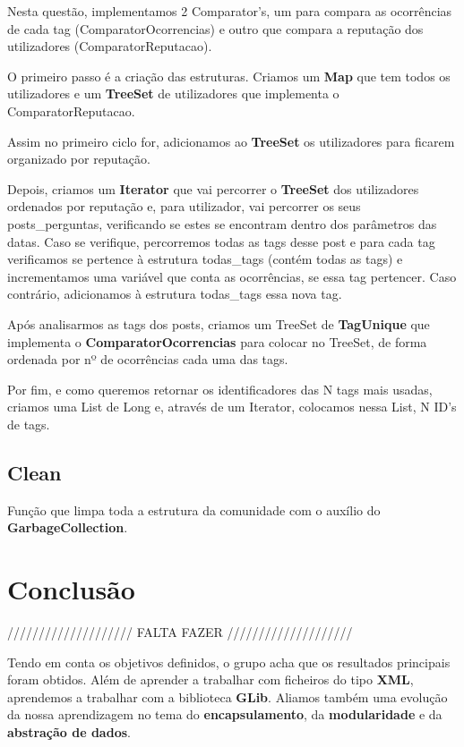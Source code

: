 \documentclass[a4paper]{article}
\begin{document}
Nesta questão, implementamos 2 Comparator's, um para compara as ocorrências de cada tag (ComparatorOcorrencias) e outro que compara a reputação dos utilizadores (ComparatorReputacao).

O primeiro passo é a criação das estruturas. Criamos um \textbf{Map} que tem todos os utilizadores e um \textbf{TreeSet} de utilizadores que implementa o ComparatorReputacao.

Assim no primeiro ciclo for, adicionamos ao \textbf{TreeSet} os utilizadores para ficarem organizado por reputação.

Depois, criamos um \textbf{Iterator} que vai percorrer o \textbf{TreeSet} dos utilizadores ordenados por reputação e, para utilizador, vai percorrer os seus posts_perguntas, verificando se estes se encontram dentro dos parâmetros das datas. Caso se verifique, percorremos todas as tags desse post e para cada tag verificamos se pertence à estrutura todas_tags (contém todas as tags) e incrementamos uma variável que conta as ocorrências, se essa tag pertencer. Caso contrário, adicionamos à estrutura todas_tags essa nova tag.

Após analisarmos as tags dos posts, criamos um TreeSet de \textbf{TagUnique} que implementa o \textbf{ComparatorOcorrencias} para colocar no TreeSet, de forma ordenada por nº de ocorrências cada uma das tags.

Por fim, e como queremos retornar os identificadores das N tags mais usadas, criamos uma List de Long  e, através de um Iterator, colocamos nessa List, N ID's de tags.

\subsection{Clean}


Função que limpa toda a estrutura da comunidade com o auxílio do \textbf{GarbageCollection}.

\section{Conclusão}
\label{sec:conclusao}

//////////////////// FALTA FAZER ////////////////////

Tendo em conta os objetivos definidos, o grupo acha que os resultados 
principais foram obtidos. Além de aprender a trabalhar com ficheiros 
do tipo \textbf{XML}, aprendemos a trabalhar com a biblioteca \textbf{GLib}.
Aliamos também uma evolução da nossa aprendizagem no tema do 
\textbf{encapsulamento}, da \textbf{modularidade} e 
da \textbf{abstração de dados}.
\end{document}
